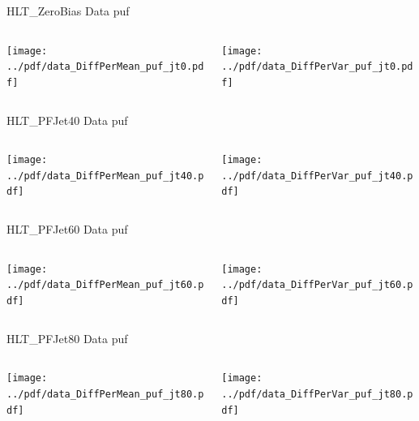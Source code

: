 \documentclass[9pt]{beamer}
\begin{document}
\begin{frame}[t]{HLT\_ZeroBias Data puf}
\begin{columns}[T]
  \begin{column}{.5\textwidth}
  \texttt{[image: ../pdf/data\_DiffPerMean\_puf\_jt0.pdf]}
  \end{column}
  \begin{column}{.5\textwidth}
  \texttt{[image: ../pdf/data\_DiffPerVar\_puf\_jt0.pdf]}
  \end{column}
\end{columns}
\end{frame}

\begin{frame}[t]{HLT\_PFJet40 Data puf}
\begin{columns}[T]
  \begin{column}{.5\textwidth}
  \texttt{[image: ../pdf/data\_DiffPerMean\_puf\_jt40.pdf]}
  \end{column}
  \begin{column}{.5\textwidth}
  \texttt{[image: ../pdf/data\_DiffPerVar\_puf\_jt40.pdf]}
  \end{column}
\end{columns}
\end{frame}

\begin{frame}[t]{HLT\_PFJet60 Data puf}
\begin{columns}[T]
  \begin{column}{.5\textwidth}
  \texttt{[image: ../pdf/data\_DiffPerMean\_puf\_jt60.pdf]}
  \end{column}
  \begin{column}{.5\textwidth}
  \texttt{[image: ../pdf/data\_DiffPerVar\_puf\_jt60.pdf]}
  \end{column}
\end{columns}
\end{frame}

\begin{frame}[t]{HLT\_PFJet80 Data puf}
\begin{columns}[T]
  \begin{column}{.5\textwidth}
  \texttt{[image: ../pdf/data\_DiffPerMean\_puf\_jt80.pdf]}
  \end{column}
  \begin{column}{.5\textwidth}
  \texttt{[image: ../pdf/data\_DiffPerVar\_puf\_jt80.pdf]}
  \end{column}
\end{columns}
\end{frame}
\end{document}
